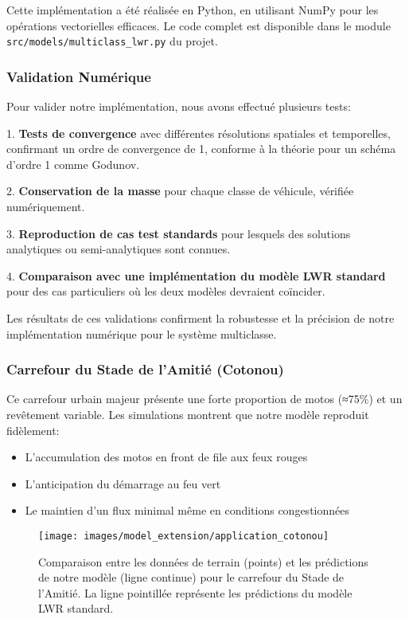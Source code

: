 Cette implémentation a été réalisée en Python, en utilisant NumPy pour les opérations vectorielles efficaces. Le code complet est disponible dans le module \texttt{src/models/multiclass\_lwr.py} du projet.

\subsubsection{Validation Numérique}
\label{subsubsec:validation_numerique}

Pour valider notre implémentation, nous avons effectué plusieurs tests:

1. \textbf{Tests de convergence} avec différentes résolutions spatiales et temporelles, confirmant un ordre de convergence de 1, conforme à la théorie pour un schéma d'ordre 1 comme Godunov.

2. \textbf{Conservation de la masse} pour chaque classe de véhicule, vérifiée numériquement.

3. \textbf{Reproduction de cas test standards} pour lesquels des solutions analytiques ou semi-analytiques sont connues.

4. \textbf{Comparaison avec une implémentation du modèle LWR standard} pour des cas particuliers où les deux modèles devraient coïncider.

Les résultats de ces validations confirment la robustesse et la précision de notre implémentation numérique pour le système multiclasse.

\subsubsection{Carrefour du Stade de l'Amitié (Cotonou)}
\label{subsubsec:carrefour_stade}

Ce carrefour urbain majeur présente une forte proportion de motos (≈75\%) et un revêtement variable. Les simulations montrent que notre modèle reproduit fidèlement:
\begin{itemize}
\item L'accumulation des motos en front de file aux feux rouges
\item L'anticipation du démarrage au feu vert
\item Le maintien d'un flux minimal même en conditions congestionnées
\end{itemize}

\begin{figure}[htbp]
\centering
\texttt{[image: images/model\_extension/application\_cotonou]}
\caption{Comparaison entre les données de terrain (points) et les prédictions de notre modèle (ligne continue) pour le carrefour du Stade de l'Amitié. La ligne pointillée représente les prédictions du modèle LWR standard.}
\label{fig:application_cotonou}
\end{figure}

